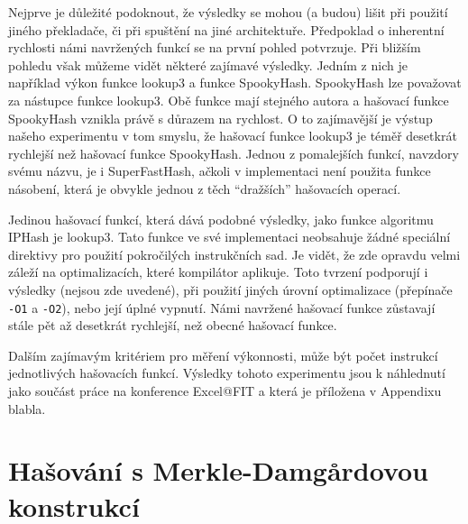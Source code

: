 Nejprve je důležité podoknout, že výsledky se mohou (a budou) lišit při použití jiného překladače, či při spuštění na jiné
architektuře. Předpoklad o inherentní rychlosti námi navržených funkcí se na první pohled potvrzuje. Při bližším pohledu však
můžeme vidět některé zajímavé výsledky. Jedním z nich je například výkon funkce lookup3 a funkce SpookyHash. SpookyHash lze
považovat za nástupce funkce lookup3. Obě funkce mají stejného autora a hašovací funkce SpookyHash vznikla právě s důrazem
na rychlost. O to zajímavější je výstup našeho experimentu v tom smyslu, že hašovací funkce lookup3 je téměř desetkrát
rychlejší než hašovací funkce SpookyHash. Jednou z pomalejších funkcí, navzdory svému názvu, je i SuperFastHash, ačkoli v
implementaci není použita funkce násobení, která je obvykle jednou z těch ``dražších'' hašovacích operací. 

Jedinou hašovací funkcí, která dává podobné výsledky, jako funkce algoritmu IPHash je lookup3. Tato funkce ve své
implementaci neobsahuje žádné speciální direktivy pro použití pokročilých instrukčních sad. Je vidět, že zde opravdu
velmi záleží na optimalizacích, které kompilátor aplikuje. Toto tvrzení podporují i výsledky (nejsou zde uvedené), při
použití jiných úrovní optimalizace (přepínače \texttt{-O1} a \texttt{-O2}), nebo její úplné vypnutí. Námi navržené hašovací
funkce zůstavají stále pět až desetkrát rychlejší, než obecné hašovací funkce. 

Dalším zajímavým kritériem pro měření výkonnosti, může být počet instrukcí jednotlivých hašovacích funkcí. Výsledky tohoto
experimentu jsou k náhlednutí jako součást práce na konference Excel@FIT a která je příložena v Appendixu blabla. 

\newpage
\section{Hašování s Merkle-Damg\r{a}rdovou konstrukcí}

